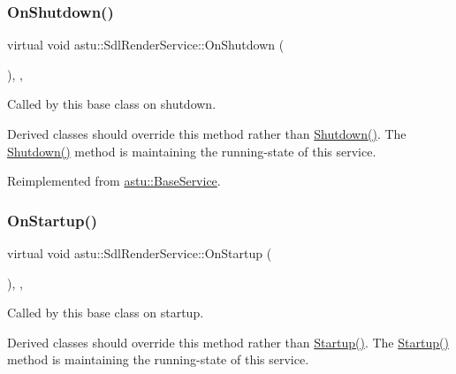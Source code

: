 \subsubsection{\texorpdfstring{On\+Shutdown()}{OnShutdown()}}
{\footnotesize\ttfamily virtual void astu\+::\+Sdl\+Render\+Service\+::\+On\+Shutdown (\begin{DoxyParamCaption}{ }\end{DoxyParamCaption})\hspace{0.3cm}{\ttfamily [override]}, {\ttfamily [protected]}, {\ttfamily [virtual]}}

Called by this base class on shutdown.

Derived classes should override this method rather than {\ttfamily \hyperlink{classastu_1_1UpdatableBaseService_a7ad7e0201007878b6014361dd5ba82f9}{Shutdown()}}. The {\ttfamily \hyperlink{classastu_1_1UpdatableBaseService_a7ad7e0201007878b6014361dd5ba82f9}{Shutdown()}} method is maintaining the running-\/state of this service. 

Reimplemented from \hyperlink{classastu_1_1BaseService_aeb5003f7c5efe5412725ac4c66942d03}{astu\+::\+Base\+Service}.

\mbox{\label{classastu_1_1SdlRenderService_a38abd541e8075e5e4eb702ca99c9b0a5}} 
\subsubsection{\texorpdfstring{On\+Startup()}{OnStartup()}}
{\footnotesize\ttfamily virtual void astu\+::\+Sdl\+Render\+Service\+::\+On\+Startup (\begin{DoxyParamCaption}{ }\end{DoxyParamCaption})\hspace{0.3cm}{\ttfamily [override]}, {\ttfamily [protected]}, {\ttfamily [virtual]}}

Called by this base class on startup.

Derived classes should override this method rather than {\ttfamily \hyperlink{classastu_1_1UpdatableBaseService_a47e3725f717cee3cd8983f485b2a0243}{Startup()}}. The {\ttfamily \hyperlink{classastu_1_1UpdatableBaseService_a47e3725f717cee3cd8983f485b2a0243}{Startup()}} method is maintaining the running-\/state of this service. 

